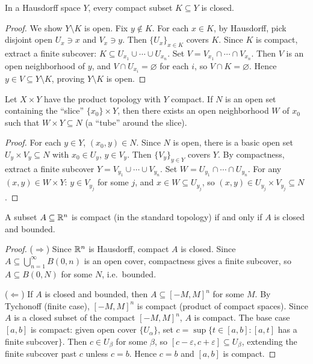 \documentclass{article}
\begin{document}
\begin{theorem}
  In a Hausdorff space $Y$, every compact subset $K \subseteq Y$ is closed.
\end{theorem}
\begin{proof}
  We show $Y \setminus K$ is open. Fix $y \notin K$.
  For each $x \in K$, by Hausdorff, pick disjoint open $U_x \ni x$
  and $V_x \ni y$.
  Then $\{U_x\}_{x \in K}$ covers $K$. Since $K$ is compact, extract
  a finite subcover:
  $K \subseteq U_{x_1} \cup \cdots \cup U_{x_n}$.
  Set $V = V_{x_1} \cap \cdots \cap V_{x_n}$. Then $V$ is an open
  neighborhood of $y$,
  and $V \cap U_{x_i} = \varnothing$ for each $i$, so $V \cap K = \varnothing$.
  Hence $y \in V \subseteq Y \setminus K$, proving $Y \setminus K$ is open.
\end{proof}

\begin{theorem}
  Let $X \times Y$ have the product topology with $Y$ compact.
  If $N$ is an open set containing the ``slice'' $\{x_0\} \times Y$,
  then there exists an open neighborhood $W$ of $x_0$ such that
  $W \times Y \subseteq N$ (a ``tube'' around the slice).
\end{theorem}
\begin{proof}
  For each $y \in Y$, $(x_0, y) \in N$. Since $N$ is open, there is a
  basic open set
  $U_y \times V_y \subseteq N$ with $x_0 \in U_y$, $y \in V_y$.
  Then $\{V_y\}_{y \in Y}$ covers $Y$. By compactness, extract a finite subcover
  $Y = V_{y_1} \cup \cdots \cup V_{y_n}$. Set $W = U_{y_1} \cap
  \cdots \cap U_{y_n}$.
  For any $(x, y) \in W \times Y$: $y \in V_{y_j}$ for some $j$, and
  $x \in W \subseteq U_{y_j}$, so $(x, y) \in U_{y_j} \times V_{y_j}
  \subseteq N$.
\end{proof}

\begin{theorem}
  A subset $A \subseteq \mathbb{R}^n$ is compact (in the standard topology)
  if and only if $A$ is closed and bounded.
\end{theorem}
\begin{proof}
  ($\Rightarrow$) Since $\mathbb{R}^n$ is Hausdorff, compact $A$ is closed.
  Since $A \subseteq \bigcup_{n=1}^\infty B(0, n)$ is an open cover,
  compactness gives a finite subcover, so $A \subseteq B(0, N)$ for
  some $N$, i.e.\ bounded.

  ($\Leftarrow$) If $A$ is closed and bounded, then $A \subseteq [-M,
  M]^n$ for some $M$.
  By Tychonoff (finite case), $[-M, M]^n$ is compact (product of
  compact spaces).
  Since $A$ is a closed subset of the compact $[-M, M]^n$, $A$ is compact.
  The base case $[a,b]$ is compact: given open cover $\{U_\alpha\}$,
  set $c = \sup\{t \in [a,b] : [a,t]$ has a finite subcover$\}$.
  Then $c \in U_\beta$ for some $\beta$, so $[c-\varepsilon,
  c+\varepsilon] \subseteq U_\beta$,
  extending the finite subcover past $c$ unless $c = b$. Hence $c =
  b$ and $[a,b]$ is compact.
\end{proof}
\end{document}
